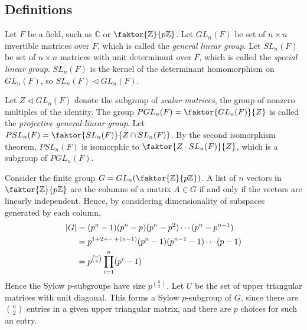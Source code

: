 \subsection{Definitions}
\begin{definition}
	Let \( F \) be a field, such as \( \mathbb C \) or \( \faktor{\mathbb Z}{p \mathbb Z} \).
	Let \( GL_n(F) \) be set of \( n \times n \) invertible matrices over \( F \), which is called the \textit{general linear group}.
	Let \( SL_n(F) \) be set of \( n \times n \) matrices with unit determinant over \( F \), which is called the \textit{special linear group}.
	\( SL_n(F) \) is the kernel of the determinant homomorphism on \( GL_n(F) \), so \( SL_n(F) \triangleleft GL_n(F) \).

	Let \( Z \triangleleft GL_n(F) \) denote the subgroup of \textit{scalar matrices}, the group of nonzero multiples of the identity.
	The group \( PGL_n(F) = \faktor{GL_n(F)}{Z} \) is called the \textit{projective general linear group}.
	Let \( PSL_n(F) = \faktor{SL_n(F)}{Z \cap SL_n(F)} \).
	By the second isomorphism theorem, \( PSL_n(F) \) is isomorphic to \( \faktor{Z \cdot SL_n(F)}{Z} \), which is a subgroup of \( PGL_n(F) \).
\end{definition}
\begin{example}
	Consider the finite group \( G = GL_n\qty(\faktor{\mathbb Z}{p\mathbb Z}) \).
	A list of \( n \) vectors in \( \faktor{\mathbb Z}{p\mathbb Z} \) are the columns of a matrix \( A \in G \) if and only if the vectors are linearly independent.
	Hence, by considering dimensionality of subspaces generated by each column,
	\begin{align*}
		\abs{G} & = (p^n - 1)(p^n - p)(p^n - p^2) \cdots (p^n - p^{n-1})      \\
		        & = p^{1+2+\dots+(n-1)} (p^n - 1)(p^{n-1} - 1) \cdots (p - 1) \\
		        & = p^{\binom{n}{2}} \prod_{i=1}^n (p^i - 1)
	\end{align*}
	Hence the Sylow \( p \)-subgroups have size \( p^{\binom{n}{2}} \).
	Let \( U \) be the set of upper triangular matrices with unit diagonal.
	This forms a Sylow \( p \)-subgroup of \( G \), since there are \( \binom{n}{2} \) entries in a given upper triangular matrix, and there are \( p \) choices for such an entry.
\end{example}

